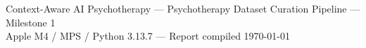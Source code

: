\documentclass[11pt,a4paper]{article}
\begin{document}
\vfill
\begin{center}
\begin{tcolorbox}[colback=lightgray!30, colframe=gray, sharp corners, boxrule=0pt, width=0.9\linewidth]
\centering
\sffamily\color{gray}\footnotesize
Context-Aware AI Psychotherapy --- Psychotherapy Dataset Curation Pipeline --- Milestone 1\\
Apple M4 / MPS / Python 3.13.7 --- Report compiled \today
\end{tcolorbox}
\end{center}
\end{document}
